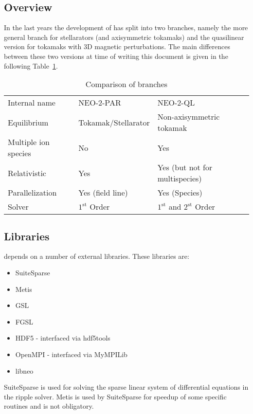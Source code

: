 \documentclass{article}
\newcommand{\vv}[1]{\texttt{\detokenize{#1}}}
\begin{document}
\subsection{Overview}
In the last years the development of \vv{NEO-2} has split into two branches,
namely the more general branch for stellarators (and axisymmetric
tokamaks) and the quasilinear version for tokamaks with 3D magnetic
perturbations. The main differences between these two versions at time
of writing this document is given in the following Table~\ref{tab:neo2branches}.

\begin{table}[h]
\centering
\begin{tabular}{lll}
Internal name   & NEO-2-PAR & NEO-2-QL\\
Equilibrium     & Tokamak/Stellarator & Non-axisymmetric tokamak\\
Multiple ion species & No & Yes\\
Relativistic    & Yes & Yes (but not for multispecies)\\
Parallelization & Yes (field line) & Yes (Species)\\
Solver          & $1^\mathrm{st}$ Order & $1^\mathrm{st}$ and $2^\mathrm{st}$ Order%
\end{tabular}
\caption{Comparison of \vv{NEO-2} branches}
\label{tab:neo2branches}
\end{table}

\subsection{Libraries\label{technicalbackground_libraries}}
\vv{NEO-2} depends on a number of external libraries. These libraries
are:
\begin{itemize}
\item SuiteSparse
\item Metis
\item GSL
\item FGSL
\item HDF5 - interfaced via hdf5tools
\item OpenMPI - interfaced via MyMPILib
\item libneo
\end{itemize}

SuiteSparse is used for solving the sparse linear system of differential
equations in the ripple solver. Metis is used by SuiteSparse for speedup
of some specific routines and is not obligatory. 
\end{document}

